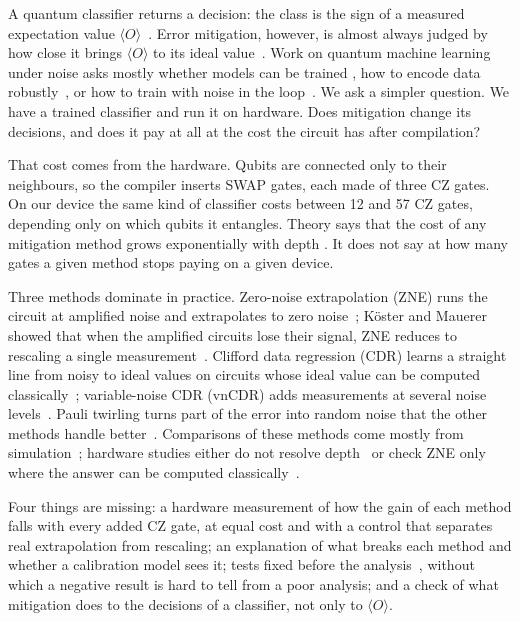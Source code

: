 \documentclass[aps,pra,twocolumn,superscriptaddress,nofootinbib,10pt]{revtex4-2}
\newcommand{\ev}[1]{\langle #1\rangle}
\begin{document}
A quantum classifier returns a decision: the class is the sign of a measured expectation
value $\ev{O}$~\cite{schuld2021,perezsalinas2020,bowles2024}. Error mitigation, however, is
almost always judged by how close it brings $\ev{O}$ to its ideal value~\cite{cai2023}. Work
on quantum machine learning under noise asks mostly whether models can be trained
\cite{wang2021nibp,wang2024em}, how to encode data robustly~\cite{larose2020}, or how to
train with noise in the loop~\cite{wang2022qnat}. We ask a simpler question. We have a
trained classifier and run it on hardware. Does mitigation change its decisions, and does it
pay at all at the cost the circuit has after compilation?

That cost comes from the hardware. Qubits are connected only to their neighbours, so the
compiler inserts SWAP gates, each made of three CZ gates. On our device the same kind of
classifier costs between 12 and 57 CZ gates, depending only on which qubits it entangles.
Theory says that the cost of any mitigation method grows exponentially with depth
\cite{takagi2022,quek2024}. It does not say at how many gates a given method stops paying on
a given device.

Three methods dominate in practice. Zero-noise extrapolation (ZNE) runs the circuit at
amplified noise and extrapolates to zero noise~\cite{temme2017,li2017,kandala2019,giurgica2020};
K\"oster and Mauerer showed that when the amplified circuits lose their signal, ZNE reduces to
rescaling a single measurement~\cite{koster2026}. Clifford data regression (CDR) learns a
straight line from noisy to ideal values on circuits whose ideal value can be computed
classically~\cite{czarnik2021}; variable-noise CDR (vnCDR) adds measurements at several noise
levels~\cite{lowe2021}. Pauli twirling turns part of the error into random noise that the
other methods handle better~\cite{wallman2016,hashim2021,kim2023}. Comparisons of these
methods come mostly from simulation~\cite{lowe2021,bultrini2023}; hardware studies either do
not resolve depth~\cite{russo2023} or check ZNE only where the answer can be computed
classically~\cite{kim2023}.

Four things are missing: a hardware measurement of how the gain of each method falls with
every added CZ gate, at equal cost and with a control that separates real extrapolation from
rescaling; an explanation of what breaks each method and whether a calibration model sees
it; tests fixed before the analysis~\cite{nosek2018}, without which a negative result is hard
to tell from a poor analysis; and a check of what mitigation does to the decisions of a
classifier, not only to $\ev{O}$.
\end{document}
